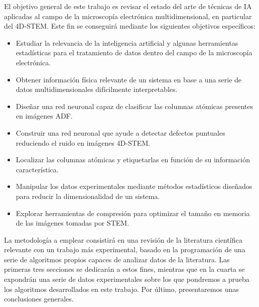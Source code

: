 El objetivo general de este trabajo es revisar el estado del arte de técnicas de IA aplicadas al campo de la microscopía electrónica multidimensional, en particular del 4D-STEM. Este fin se conseguirá mediante los siguientes objetivos específicos:

\begin{itemize}
    \item Estudiar la relevancia de la inteligencia artificial y algunas herramientas estadísticas para el tratamiento de datos dentro del campo de la microscopía electrónica. %
    
    \item Obtener información física relevante de un sistema en base a una serie de datos multidimensionales difícilmente interpretables. %
    
    \item Diseñar una red neuronal capaz de clasificar las columnas atómicas presentes en imágenes ADF. %
    
    \item Construir una red neuronal que ayude a detectar defectos puntuales reduciendo el ruido en imágenes 4D-STEM. %
    
    \item Localizar las columnas atómicas y etiquetarlas en función de su información característica. %
    
    \item Manipular los datos experimentales mediante métodos estadísticos diseñados para reducir la dimensionalidad de un sistema. %
    
    \item Explorar herramientas de compresión para optimizar el tamaño en memoria de las imágenes tomadas por STEM. %
\end{itemize}

La metodología a emplear consistirá en una revisión de la literatura científica relevante con un trabajo más experimental, basado en la programación de una serie de algoritmos propios capaces de analizar datos de la literatura. Las primeras tres secciones se dedicarán a estos fines, mientras que en la cuarta se expondrán una serie de datos experimentales sobre los que pondremos a prueba los algoritmos desarrollados en este trabajo. Por último, presentaremos unas conclusiones generales.